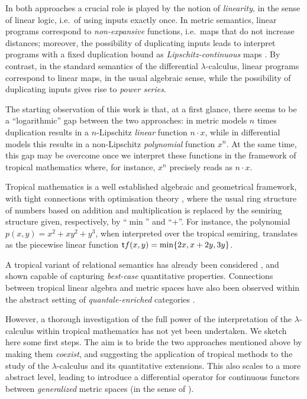 \documentclass[submission,%
]{eptcs}
\begin{document}
In both approaches a crucial role is played by the notion of \emph{linearity}, in the sense of linear logic, i.e.~of using inputs exactly once. In metric semantics, linear programs correspond to \emph{non-expansive} functions, i.e.\ maps that do not increase distances; moreover, the possibility of duplicating inputs leads to interpret programs with a fixed duplication bound as \emph{Lipschitz-continuous} maps \cite{Gaboardi2017}.
By contrast, in the standard semantics of the differential $\lambda$-calculus, linear programs correspond to linear maps, in the usual algebraic sense, while the possibility of duplicating inputs gives rise to \emph{power series}.

The starting observation of this work is that, at a first glance, there seems to be a  ``logarithmic'' gap between the two approaches:
in metric models $n$ times duplication results in a $n$-Lipschitz \emph{linear} function $n\cdot x$, while in differential models this results in a non-Lipschitz \emph{polynomial} function $x^{n}$.
 At the same time, 
this gap may be overcome once we interpret these functions in the framework of tropical mathematics where, for instance, $x^{n}$ precisely reads as $n\cdot x$.

Tropical mathematics \cite{Simon} is a well established algebraic and geometrical framework, with tight connections with optimisation theory \cite{Sturmfelds}, where the usual ring structure of numbers based on addition and multiplication is replaced by the semiring structure given, respectively, by ``$\min$'' and ``$+$''.
For instance, the polynomial $p(x,y)=x^{2}+xy^{2}+y^{3}$, when interpreted over the tropical semiring, translates as the piecewise linear function
$
\mathsf{t} f(x,y)=\min\{2x, x+2y, 3y\}
$.

A tropical variant of relational semantics has already been considered \cite{Manzo2013}, and shown capable of capturing \emph{best-case} quantitative properties.
Connections between tropical linear algebra and metric spaces have also been observed \cite{Fuji} within the abstract setting of \emph{quantale-enriched} categories \cite{Hofmann2014, Stubbe2014}.

However, a thorough investigation of the full power of the interpretation of the $\lambda$-calculus within tropical mathematics has not yet been undertaken.
We sketch here some first steps.
The aim is to bride the two approaches mentioned above by making them \emph{coexist}, and suggesting the application of tropical methods to the study of the $\lambda$-calculus and its quantitative extensions.
This also scales to a 
more abstract level, leading to introduce a differential operator for continuous functors between \emph{generalized} metric spaces (in the sense of \cite{Lawvere1973}).
\end{document}
